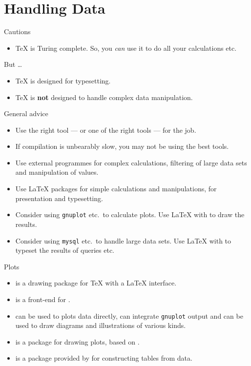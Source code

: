 \section{Handling Data}

\begin{frame}{Cautions}
  \begin{itemize}
    \item \TeX{} is Turing complete.
    So, you \emph{can} use it to do all your calculations etc.
  \end{itemize}
  But \dots
  \begin{itemize}
    \item \TeX{} is designed for typesetting.
    \item \TeX{} is \textbf{not} designed to handle complex data manipulation.
  \end{itemize}
\end{frame}
\begin{frame}[fragile]{General advice}
  \begin{itemize}
    \item Use the right tool --- or one of the right tools --- for the job.
    \item If compilation is unbearably slow, you may not be using the best tools.
    \item Use external programmes for complex calculations, filtering of large data sets and manipulation of values.
    \item Use \LaTeX{} packages for simple calculations and manipulations, for presentation and typesetting.
    \item Consider using \verb|gnuplot| etc.\ to calculate plots.
    Use \LaTeX{} with \pgf{} to draw the results.
    \item Consider using \verb|mysql| etc.\ to handle large data sets.
    Use \LaTeX{} with  to typeset the results of queries etc.
  \end{itemize}
\end{frame}

\begin{frame}[fragile]{Plots}
  \begin{itemize}
    \item \pgf{} is a drawing package for \TeX{} with a \LaTeX{} interface.
    \item \Tikz{} is a front-end for \pgf{}.
    \item \tikzpgf{} can be used to plots data directly, can integrate \verb|gnuplot| output and can be used to draw diagrams and illustrations of various kinds.
    \item \pgfplots{} is a package for drawing plots, based on \tikzpgf{}.
    \item \pgfplotstable{} is a package provided by \pgfplots{} for constructing tables from data.
  \end{itemize}
\end{frame}

